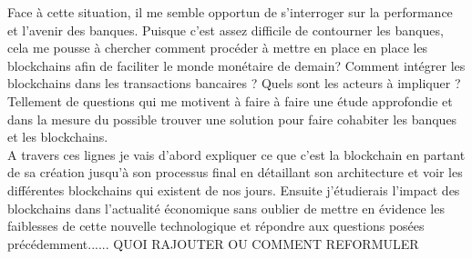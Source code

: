 \documentclass[12pt]{report}
\begin{document}
\hspace{1cm} Face à cette situation, il me semble opportun de s'interroger sur la performance et l'avenir des banques. Puisque c'est assez difficile de contourner les banques, cela me pousse à chercher comment procéder à mettre en place en place les blockchains afin de faciliter le monde monétaire de demain? Comment intégrer les blockchains dans les transactions bancaires ? Quels sont les acteurs à impliquer ? Tellement de questions qui me motivent à faire à faire une étude approfondie et dans la mesure du possible trouver une solution pour faire cohabiter les banques et les blockchains.\\

\hspace{1cm} A travers ces lignes je vais d'abord expliquer ce que c'est la blockchain en partant de sa création jusqu'à son processus final en détaillant son architecture et voir les différentes blockchains qui existent de nos jours. Ensuite j'étudierais l'impact des blockchains dans l'actualité économique sans oublier de mettre en évidence les faiblesses de cette nouvelle technologique et répondre aux questions posées précédemment...... QUOI RAJOUTER OU COMMENT REFORMULER


\newpage
\end{document}
